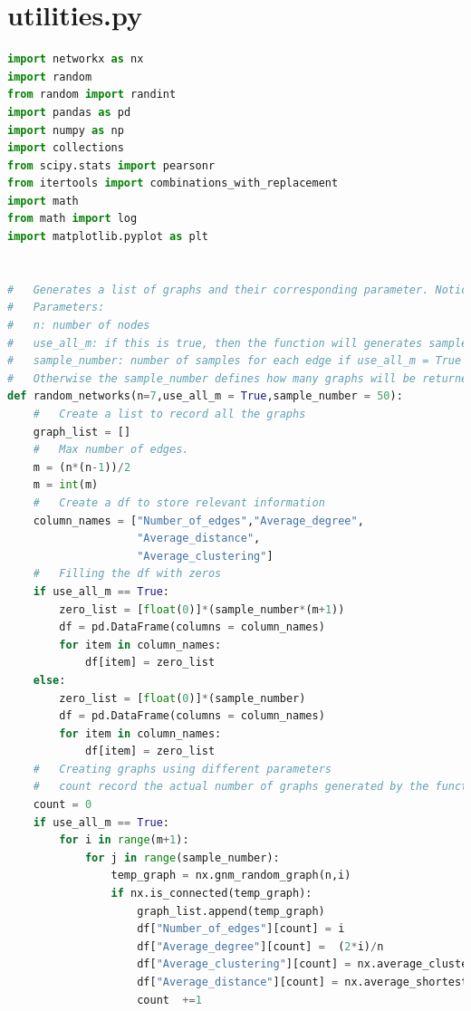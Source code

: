 \documentclass[12pt]{article}
\begin{document}
\section{utilities.py}
\label{utilities_code}
\begin{lstlisting}[language=Python,breaklines=true]
import networkx as nx
import random
from random import randint
import pandas as pd
import numpy as np
import collections
from scipy.stats import pearsonr
from itertools import combinations_with_replacement
import math
from math import log
import matplotlib.pyplot as plt


#   Generates a list of graphs and their corresponding parameter. Notices the function will only return connected graphs, disconnected graphs will not be returned. Thus the actual number of graphs returned will be less than expected.
#   Parameters:
#   n: number of nodes
#   use_all_m: if this is true, then the function will generates samples using all the edge numbers * sample_number
#   sample_number: number of samples for each edge if use_all_m = True
#   Otherwise the sample_number defines how many graphs will be returned in total
def random_networks(n=7,use_all_m = True,sample_number = 50):
    #   Create a list to record all the graphs
    graph_list = []
    #   Max number of edges.
    m = (n*(n-1))/2
    m = int(m)
    #   Create a df to store relevant information
    column_names = ["Number_of_edges","Average_degree",
                    "Average_distance",
                    "Average_clustering"]
    #   Filling the df with zeros
    if use_all_m == True:
        zero_list = [float(0)]*(sample_number*(m+1))
        df = pd.DataFrame(columns = column_names)
        for item in column_names:
            df[item] = zero_list 
    else:
        zero_list = [float(0)]*(sample_number)
        df = pd.DataFrame(columns = column_names)
        for item in column_names:
            df[item] = zero_list 
    #   Creating graphs using different parameters
    #   count record the actual number of graphs generated by the function
    count = 0
    if use_all_m == True:
        for i in range(m+1):
            for j in range(sample_number):
                temp_graph = nx.gnm_random_graph(n,i)
                if nx.is_connected(temp_graph):
                    graph_list.append(temp_graph)
                    df["Number_of_edges"][count] = i
                    df["Average_degree"][count] =  (2*i)/n
                    df["Average_clustering"][count] = nx.average_clustering(temp_graph)
                    df["Average_distance"][count] = nx.average_shortest_path_length(temp_graph)
                    count  +=1


\end{lstlisting}
\end{document}
